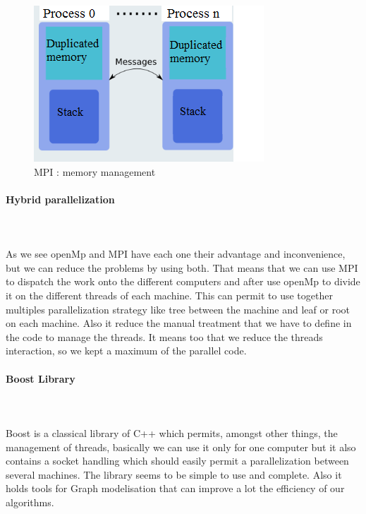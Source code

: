 \begin{figure}[!h] 
\centerline{\includegraphics[scale=0.85]{3_Software_considered/MultithreadingMP_boost_Visual_MPI_5000_Zotero_Project_Baptiste/MPI}}
   \caption{\label{étiquette} MPI : memory management}
\end{figure}


\paragraph{Hybrid parallelization}\mbox{}\\\mbox{}\\
	As we see openMp and MPI have each one their advantage and inconvenience, but we can reduce the problems by using both. That means that we can use MPI to dispatch the work onto the different computers and after use openMp to divide it on the different threads of each machine. This can permit to use together multiples parallelization strategy like tree between the machine and leaf or root on each machine. Also it reduce the manual treatment that we have to define in the code to manage the threads. It means too that we reduce the threads interaction, so we kept a maximum of the parallel code.

\paragraph{Boost Library}\mbox{}\\\mbox{}\\
	Boost is a classical library of C++ which permits, amongst other things, the management of threads, basically we can use it only for one computer but it also contains a socket handling which should easily permit a parallelization between several machines. The library seems to be simple to use and complete. Also it holds tools for Graph modelisation that can improve a lot the efficiency of our algorithms.

